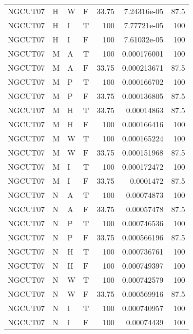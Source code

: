 \begin{table}[!htb]
{\begin{tabular}{llllrrr}
            NGCUT07  & H     & W     & F          & 33.75      & 7.24316e-05 & 87.5     \\
            NGCUT07  & H     & I     & T          & 100        & 7.77721e-05 & 100      \\
            NGCUT07  & H     & I     & F          & 100        & 7.61032e-05 & 100      \\
            NGCUT07  & M     & A     & T          & 100        & 0.000176001 & 100      \\
            NGCUT07  & M     & A     & F          & 33.75      & 0.000213671 & 87.5     \\
            NGCUT07  & M     & P     & T          & 100        & 0.000166702 & 100      \\
            NGCUT07  & M     & P     & F          & 33.75      & 0.000136805 & 87.5     \\
            NGCUT07  & M     & H     & T          & 33.75      & 0.00014863  & 87.5     \\
            NGCUT07  & M     & H     & F          & 100        & 0.000166416 & 100      \\
            NGCUT07  & M     & W     & T          & 100        & 0.000165224 & 100      \\
            NGCUT07  & M     & W     & F          & 33.75      & 0.000151968 & 87.5     \\
            NGCUT07  & M     & I     & T          & 100        & 0.000172472 & 100      \\
            NGCUT07  & M     & I     & F          & 33.75      & 0.0001472   & 87.5     \\
            NGCUT07  & N     & A     & T          & 100        & 0.00074873  & 100      \\
            NGCUT07  & N     & A     & F          & 33.75      & 0.00057478  & 87.5     \\
            NGCUT07  & N     & P     & T          & 100        & 0.000746536 & 100      \\
            NGCUT07  & N     & P     & F          & 33.75      & 0.000566196 & 87.5     \\
            NGCUT07  & N     & H     & T          & 100        & 0.000736761 & 100      \\
            NGCUT07  & N     & H     & F          & 100        & 0.000749397 & 100      \\
            NGCUT07  & N     & W     & T          & 100        & 0.000742579 & 100      \\
            NGCUT07  & N     & W     & F          & 33.75      & 0.000569916 & 87.5     \\
            NGCUT07  & N     & I     & T          & 100        & 0.000740957 & 100      \\
            NGCUT07  & N     & I     & F          & 100        & 0.00074439  & 100      \\
            \hline
        \end{tabular}
    }{}
\end{table}